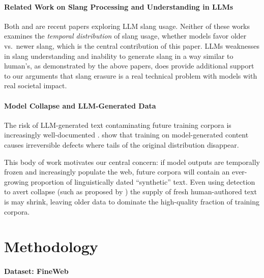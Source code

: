 \documentclass[11pt]{article}
\begin{document}
\paragraph{Related Work on Slang Processing and Understanding in LLMs}

Both \citet{sun2024slang} and \citet{wu2025slang} are recent papers exploring LLM slang usage. Neither of these works examines the \textit{temporal distribution} of slang usage, whether models favor older vs.\ newer slang, which is the central contribution of this paper. LLMs weaknesses in slang understanding and inability to generate slang in a way similar to human's, as demonstrated by the above papers, does provide additional support to our arguments that slang erasure is a real technical problem with models with real societal impact.

\paragraph{Model Collapse and LLM-Generated Data}

The risk of LLM-generated text contaminating future training corpora is increasingly well-documented \citep{shumailov2023curse, rahmani2025synthetic,drayson2025mgtext,feng2024collapse}. \citet{shumailov2023curse} show that training on model-generated content causes irreversible defects where tails of the original distribution disappear. %

This body of work motivates our central concern: if model outputs are temporally frozen and increasingly populate the web, future corpora will contain an ever-growing proportion of linguistically dated ``synthetic'' text. Even using detection to avert collapse (such as proposed by \citep{drayson2025mgtext}) the supply of fresh human-authored text is may shrink, leaving older data to dominate the high-quality fraction of training corpora.

\section{Methodology}

\paragraph{Dataset: FineWeb}
\end{document}
